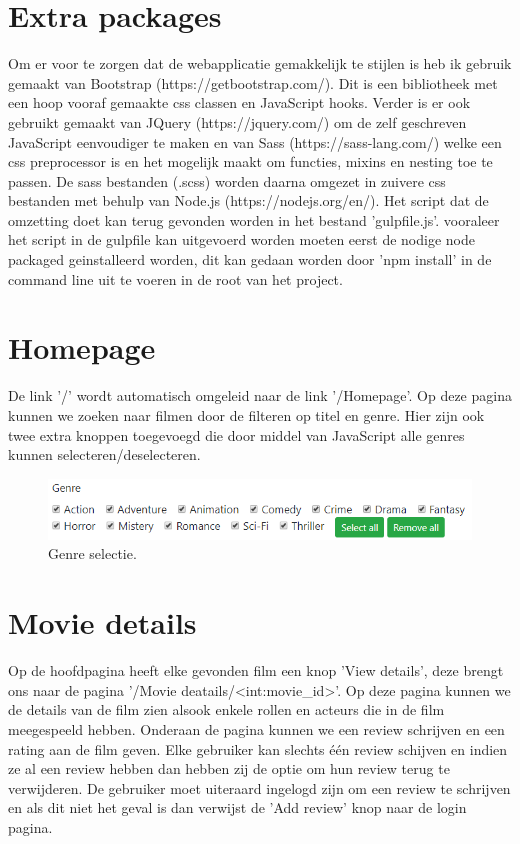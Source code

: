 \documentclass[12px]{article}
\begin{document}
\section{Extra packages}
Om er voor te zorgen dat de webapplicatie gemakkelijk te stijlen is heb ik gebruik gemaakt van Bootstrap (https://getbootstrap.com/). Dit is een bibliotheek met een hoop vooraf gemaakte css classen en JavaScript hooks. Verder is er ook gebruikt gemaakt van JQuery (https://jquery.com/) om de zelf geschreven JavaScript eenvoudiger te maken en van Sass (https://sass-lang.com/) welke een css preprocessor is  en het mogelijk maakt om functies, mixins en nesting toe te passen. De sass bestanden (.scss) worden daarna omgezet in zuivere css bestanden met behulp van Node.js (https://nodejs.org/en/). Het script dat de omzetting doet kan terug gevonden worden in het bestand 'gulpfile.js'. vooraleer het script in de gulpfile kan uitgevoerd worden moeten eerst de nodige node packaged geinstalleerd worden, dit kan gedaan worden door 'npm install' in de command line uit te voeren in de root van het project.

\section{Homepage}
De link '/' wordt automatisch omgeleid naar de link '/Homepage'. Op deze pagina kunnen we zoeken naar filmen door de filteren op titel en genre. Hier zijn ook twee extra knoppen toegevoegd die door middel van JavaScript alle genres kunnen selecteren/deselecteren.
\begin{figure}[!hbp]
\includegraphics[width=\textwidth]{genre-select}
\caption{Genre selectie.}
\end{figure}

\section{Movie details}
Op de hoofdpagina heeft elke gevonden film een knop 'View details', deze brengt ons naar de pagina '/Movie deatails/<int:movie\_id>'. Op deze pagina kunnen we de details van de film zien alsook enkele rollen en acteurs die in de film meegespeeld hebben. Onderaan de pagina kunnen we een review schrijven en een rating aan de film geven. Elke gebruiker kan slechts één review schijven en indien ze al een review hebben dan hebben zij de optie om hun review terug te verwijderen. De gebruiker moet uiteraard ingelogd zijn om een review te schrijven en als dit niet het geval is dan verwijst de 'Add review' knop naar de login pagina.
\end{document}
